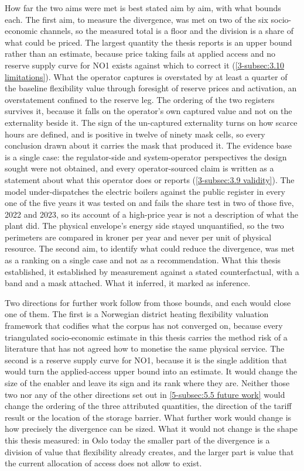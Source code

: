 How far the two aims were met is best stated aim by aim, with what bounds each. The first aim, to measure the divergence, was met on two of the six socio-economic channels, so the measured total is a floor and the division is a share of what could be priced. The largest quantity the thesis reports is an upper bound rather than an estimate, because price taking fails at applied access and no reserve supply curve for NO1 exists against which to correct it (\autoref{3-subsec:3.10 limitations}). What the operator captures is overstated by at least a quarter of the baseline flexibility value through foresight of reserve prices and activation, an overstatement confined to the reserve leg. The ordering of the two registers survives it, because it falls on the operator's own captured value and not on the externality beside it. The sign of the un-captured externality turns on how scarce hours are defined, and is positive in twelve of ninety mask cells, so every conclusion drawn about it carries the mask that produced it. The evidence base is a single case: the regulator-side and system-operator perspectives the design sought were not obtained, and every operator-sourced claim is written as a statement about what this operator does or reports (\autoref{3-subsec:3.9 validity}). The model under-dispatches the electric boilers against the public register in every one of the five years it was tested on and fails the share test in two of those five, 2022 and 2023, so its account of a high-price year is not a description of what the plant did. The physical envelope's energy side stayed unquantified, so the two perimeters are compared in kroner per year and never per unit of physical resource. The second aim, to identify what could reduce the divergence, was met as a ranking on a single case and not as a recommendation. What this thesis established, it established by measurement against a stated counterfactual, with a band and a mask attached. What it inferred, it marked as inference.

Two directions for further work follow from those bounds, and each would close one of them. The first is a Norwegian district heating flexibility valuation framework that codifies what the corpus has not converged on, because every triangulated socio-economic estimate in this thesis carries the method risk of a literature that has not agreed how to monetise the same physical service. The second is a reserve supply curve for NO1, because it is the single addition that would turn the applied-access upper bound into an estimate. It would change the size of the enabler and leave its sign and its rank where they are. Neither those two nor any of the other directions set out in \autoref{5-subsec:5.5 future work} would change the ordering of the three attributed quantities, the direction of the tariff result or the location of the storage barrier. What further work would change is how precisely the divergence can be sized. What it would not change is the shape this thesis measured: in Oslo today the smaller part of the divergence is a division of value that flexibility already creates, and the larger part is value that the current allocation of access does not allow to exist.

\newpage
